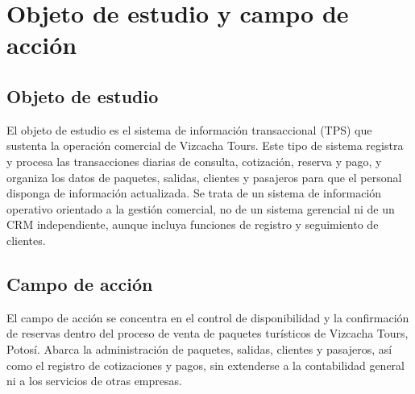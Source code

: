 \chapter{Objeto de estudio y campo de acción}
\label{cap:objeto}

\section{Objeto de estudio}

El objeto de estudio es el sistema de información transaccional (TPS) que
sustenta la operación comercial de Vizcacha Tours. Este tipo de sistema
registra y procesa las transacciones diarias de consulta, cotización, reserva
y pago, y organiza los datos de paquetes, salidas, clientes y pasajeros para
que el personal disponga de información actualizada. Se trata de un sistema de
información operativo orientado a la gestión comercial, no de un sistema
gerencial ni de un CRM independiente, aunque incluya funciones de registro y
seguimiento de clientes.

\section{Campo de acción}

El campo de acción se concentra en el control de disponibilidad y la
confirmación de reservas dentro del proceso de venta de paquetes turísticos de
Vizcacha Tours, Potosí. Abarca la administración de paquetes, salidas,
clientes y pasajeros, así como el registro de cotizaciones y pagos, sin
extenderse a la contabilidad general ni a los servicios de otras empresas.
